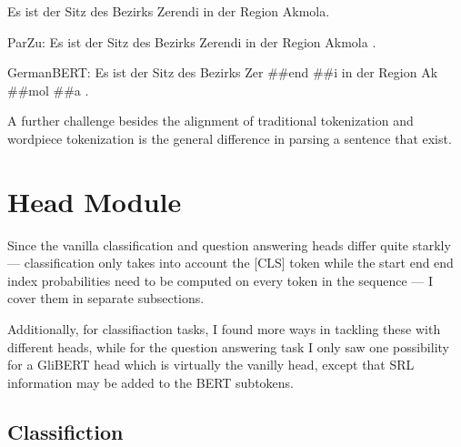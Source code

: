 \begin{examples}
	\label{ex:tokenization-diff}
	\item Es ist der Sitz des Bezirks Zerendi in der Region Akmola.
	\item ParZu: Es ist der Sitz des Bezirks Zerendi in der Region Akmola .
	\item GermanBERT: Es ist der Sitz des Bezirks Zer \#\#end \#\#i in der Region Ak \#\#mol \#\#a .
\end{examples}


A further challenge besides the alignment of traditional tokenization and wordpiece tokenization is
the general difference in parsing a sentence that exist.

\section{Head Module}

Since the vanilla classification and question answering heads differ quite
starkly --- classification only takes into account the [CLS] token while
the start end end index probabilities need to be computed on every token
in the sequence --- I cover them in separate subsections.

Additionally, for classifiaction tasks, I found more ways in tackling these
with different heads, while for the question answering task I only saw one
possibility for a GliBERT head which is virtually the vanilly head, except
that SRL information may be added to the BERT subtokens.


\subsection{Classifiction}



